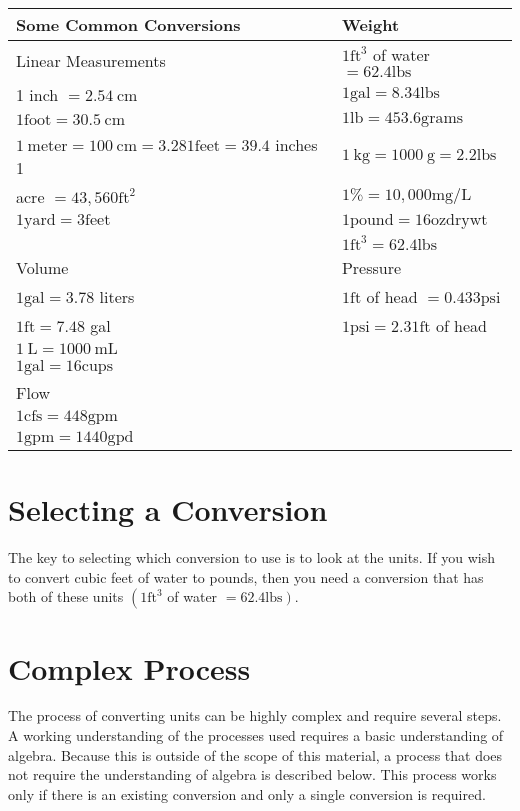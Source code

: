 \begin{tabular}{|l|l|}
\hline
Some Common Conversions & Weight \\
\hline
Linear Measurements & $1 \mathrm{ft}^{3}$ of water $=62.4 \mathrm{lbs}$ \\
\hline
1 inch $=2.54 \mathrm{~cm}$ & $1 \mathrm{gal}=8.34 \mathrm{lbs}$ \\
$1 \mathrm{foot}=30.5 \mathrm{~cm}$ & $1 \mathrm{lb}=453.6 \mathrm{grams}$ \\
$1 \mathrm{~meter}=100 \mathrm{~cm}=3.281 \mathrm{feet}=39.4$ inches 1 & $1 \mathrm{~kg}=1000 \mathrm{~g}=2.2 \mathrm{lbs}$ \\
acre $=43,560 \mathrm{ft}^{2}$ & $1 \%=10,000 \mathrm{mg} / \mathrm{L}$ \\
$1 \mathrm{yard}=3 \mathrm{feet}$ & $1 \mathrm{pound}=16 \mathrm{oz} \mathrm{dry} \mathrm{wt}$ \\
 & $1 \mathrm{ft}^{3}=62.4 \mathrm{lbs}$ \\
\hline
Volume & Pressure \\
\hline
$1 \mathrm{gal}=3.78$ liters & $1 \mathrm{ft}$ of head $=0.433 \mathrm{psi}$ \\
$1 \mathrm{ft}=7.48$ gal & $1 \mathrm{psi}=2.31 \mathrm{ft}$ of head \\
$1 \mathrm{~L}=1000 \mathrm{~mL}$ &  \\
$1 \mathrm{gal}=16 \mathrm{cups}$ &  \\
\hline
Flow &  \\
\hline
$1 \mathrm{cfs}=448 \mathrm{gpm}$ &  \\
$1 \mathrm{gpm}=1440 \mathrm{gpd}$ &  \\
\hline
\end{tabular}

\section{Selecting a Conversion}
The key to selecting which conversion to use is to look at the units. If you wish to convert cubic feet of water to pounds, then you need a conversion that has both of these units $\left(1 \mathrm{ft}^{3}\right.$ of water $\left.=62.4 \mathrm{lbs}\right)$.

\section{Complex Process}
The process of converting units can be highly complex and require several steps. A working understanding of the processes used requires a basic understanding of algebra. Because this is outside of the scope of this material, a process that does not require the understanding of algebra is described below. This process works only if there is an existing conversion and only a single conversion is required.

